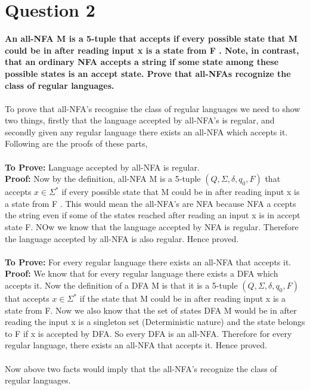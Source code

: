 \documentclass{article}
\begin{document}
\section{Question 2}
\textbf{An all-NFA M is a 5-tuple  that accepts  
if every possible state that M could be in after reading input x is a state from F . Note, in contrast, that an ordinary NFA 
accepts a string if some state among these possible states is an accept state. Prove that all-NFAs recognize the class of regular languages.}\\
\\
To prove that all-NFA's recognise the class of regular languages we need to show two things, firstly that the language accepted 
by all-NFA's is regular, and secondly given any regular language there exists an all-NFA which accepts it. Following are the proofs of these parts,
\\
\\
\textbf{To Prove:} Language accepted by all-NFA is regular.\\
\textbf{Proof:} Now by the definition, all-NFA M is a 5-tuple $(Q, \Sigma, \delta, q_0 , F )$ that accepts $x \in \Sigma^{*}$ if 
every possible state that M could be in after reading input x is a state from F . This would mean the all-NFA's are NFA because NFA a
ccepts the string even if some of the states reached after reading an input x is in accept state F. NOw we know that the language 
accepted by NFA is regular. Therefore the language accepted by all-NFA is also regular. Hence proved.\\
\\
\textbf{To Prove:} For every regular language there exists an all-NFA that accepts it.\\
\textbf{Proof:} We know that for every regular language there exists a DFA which accepts it. Now the definition of a 
DFA M is that it is a 5-tuple $(Q, \Sigma, \delta, q_0 , F )$ that accepts $x \in \Sigma^{*}$ if the state that M could 
be in after reading input x is a state from F. Now we also know that the set of states DFA M would be in after reading the 
input x is a singleton set (Deterministic nature) and the state belongs to F if x is accepted by DFA. So every DFA is an
 all-NFA. Therefore for every regular language, there exists an all-NFA that accepts it. Hence proved.\\
\\
Now above two facts would imply that the all-NFA's recognize the class of regular languages.
\end{document}
